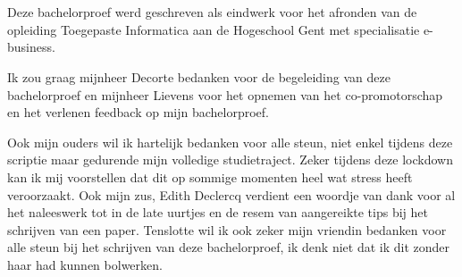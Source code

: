 
\chapter*{}
\label{ch:voorwoord}



Deze bachelorproef werd geschreven als eindwerk voor het afronden van de opleiding Toegepaste Informatica aan de Hogeschool Gent met specialisatie e-business.


Ik zou graag mijnheer Decorte bedanken voor de begeleiding van deze bachelorproef en mijnheer Lievens voor het opnemen van het co-promotorschap en het verlenen feedback op mijn bachelorproef.

Ook mijn ouders wil ik hartelijk bedanken voor alle steun, niet enkel tijdens deze scriptie maar gedurende mijn volledige studietraject. Zeker tijdens deze lockdown kan ik mij voorstellen dat dit op sommige momenten heel wat stress heeft veroorzaakt.
Ook mijn zus, Edith Declercq verdient een woordje van dank voor al het naleeswerk tot in de late uurtjes en de resem van aangereikte tips bij het schrijven van een paper. 
Tenslotte wil ik ook zeker mijn vriendin bedanken voor alle steun bij het schrijven van deze bachelorproef, ik denk niet dat ik dit zonder haar had kunnen bolwerken.

 




